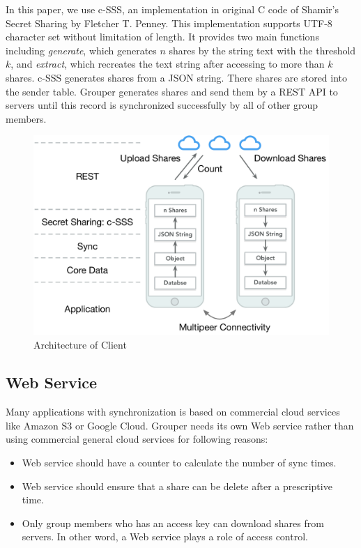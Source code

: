 \documentclass[twocolumn,10pt]{article}
\begin{document}
In this paper, we use c-SSS\cite{c-sss}, an implementation in original C code of Shamir's Secret Sharing by Fletcher T. Penney. This implementation supports UTF-8 character set without limitation of length. It provides two main functions including \emph{generate}, which generates $n$ shares by the string text with the threshold $k$, and \emph{extract}, which recreates the text string after accessing to more than $k$ shares. c-SSS generates shares from a JSON string. There shares are stored into the sender table. Grouper generates shares and send them by a REST API to servers until this record is synchronized successfully by all of other group members.

\begin{figure}[t]
\centering
\includegraphics[scale=0.35]{architecture}
\caption{Architecture of Client}
\end{figure}

\subsection{Web Service}
Many applications with synchronization is based on commercial cloud services like Amazon S3 or Google Cloud. Grouper needs its own Web service rather than using commercial general cloud services for following reasons:

\begin{itemize}
\setlength{\itemsep}{1pt}
\setlength{\parskip}{0pt}
\setlength{\parsep}{0pt}
	\item Web service should have a counter to calculate the number of sync times.
    \item Web service should ensure that a share can be delete after a prescriptive time.
    \item Only group members who has an access key can download shares from servers. In other word, a Web service plays a role of access control.
\end{itemize}
\end{document}
